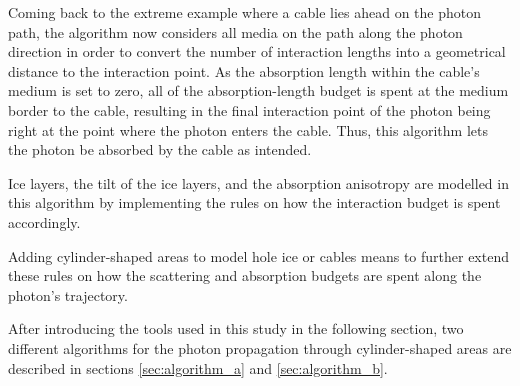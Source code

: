 Coming back to the extreme example where a cable lies ahead on the photon path, the algorithm now considers all media on the path along the photon direction in order to convert the number of interaction lengths into a geometrical distance to the interaction point. As the absorption length within the cable's medium is set to zero, all of the absorption-length budget is spent at the medium border to the cable, resulting in the final interaction point of the photon being right at the point where the photon enters the cable. Thus, this algorithm lets the photon be absorbed by the cable as intended.

Ice layers, the tilt of the ice layers, and the absorption anisotropy are modelled in this algorithm by implementing the rules on how the interaction budget is spent accordingly.

Adding cylinder-shaped areas to model hole ice or cables means to further extend these rules on how the scattering and absorption budgets are spent along the photon's trajectory.

After introducing the tools used in this study in the following section, two different algorithms for the photon propagation through cylinder-shaped areas are described in sections \ref{sec:algorithm_a} and \ref{sec:algorithm_b}.

